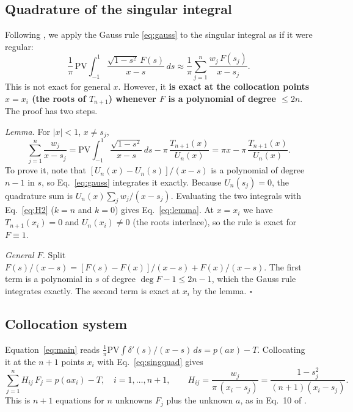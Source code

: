 \documentclass[12pt]{article}
\newcommand{\PV}{\mathrm{PV}\!\!}
\begin{document}
\subsection{Quadrature of the singular integral}\label{sec:singquad}
Following \textcite{ErdoganEtAl1973}, we apply the Gauss rule \eqref{eq:gauss} to
the singular integral as if it were regular:
\begin{equation}\label{eq:singquad}
	\frac1\pi\,\PV\int_{-1}^{1}\frac{\sqrt{1-s^2}\,F(s)}{x-s}\,ds
	\approx \frac1\pi\sum_{j=1}^{n}\frac{w_j\,F(s_j)}{x-s_j}.
\end{equation}
This is not exact for general $x$. However, it \textbf{is exact at the
collocation points $x=x_i$ (the roots of $T_{n+1}$) whenever $F$ is a polynomial
of degree $\le 2n$}. The proof has two steps.

\emph{Lemma.} For $|x|<1$, $x\neq s_j$,
\begin{equation}\label{eq:lemma}
	\sum_{j=1}^{n}\frac{w_j}{x-s_j}
	= \PV\int_{-1}^{1}\frac{\sqrt{1-s^2}}{x-s}\,ds - \pi\,\frac{T_{n+1}(x)}{U_n(x)}
	= \pi x - \pi\,\frac{T_{n+1}(x)}{U_n(x)} .
\end{equation}
To prove it, note that $[U_n(x)-U_n(s)]/(x-s)$ is a polynomial of degree $n-1$
in $s$, so Eq.~\eqref{eq:gauss} integrates it exactly. Because $U_n(s_j)=0$, the
quadrature sum is $U_n(x)\sum_j w_j/(x-s_j)$. Evaluating the two integrals with
Eq.~\eqref{eq:H2} ($k=n$ and $k=0$) gives Eq.~\eqref{eq:lemma}. At $x=x_i$ we
have $T_{n+1}(x_i)=0$ and $U_n(x_i)\ne0$ (the roots interlace), so the rule is
exact for $F\equiv1$.

\emph{General $F$.} Split
$F(s)/(x-s) = [F(s)-F(x)]/(x-s) + F(x)/(x-s)$. The first term is a polynomial
in $s$ of degree $\deg F - 1 \le 2n-1$, which the Gauss rule integrates exactly.
The second term is exact at $x_i$ by the lemma. \hfill$\square$

\subsection{Collocation system}
Equation~\eqref{eq:main} reads
$\frac1\pi\PV\int\delta'(s)/(x-s)\,ds = p(ax)-T$. Collocating it at the $n+1$
points $x_i$ with Eq.~\eqref{eq:singquad} gives
\begin{equation}\label{eq:system}
	\sum_{j=1}^{n} H_{ij}\,F_j = p(a x_i) - T, \quad i=1,\dots,n+1,
	\qquad
	H_{ij} = \frac{w_j}{\pi\,(x_i-s_j)} = \frac{1-s_j^2}{(n+1)(x_i-s_j)} .
\end{equation}
This is $n+1$ equations for $n$ unknowns $F_j$ plus the unknown $a$, as in
Eq.~10 of \textcite{ViescaGaragash2018}.
\end{document}
